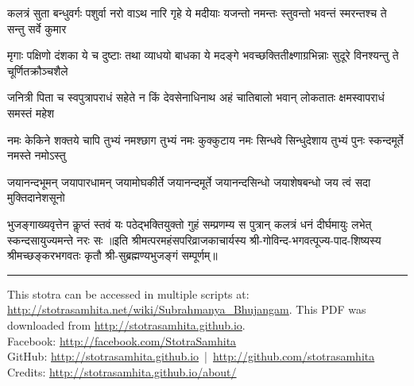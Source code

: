 \documentclass[a5paper,twoside,12pt]{book}
\begin{document}
\begin{center}
\fourlineindentedshloka
{कलत्रं सुता बन्धुवर्गः पशुर्वा}
{नरो वाऽथ नारि गृहे ये मदीयाः}
{यजन्तो नमन्तः स्तुवन्तो भवन्तं}
{स्मरन्तश्च ते सन्तु सर्वे कुमार}

\fourlineindentedshloka
{मृगाः पक्षिणो दंशका ये च दुष्टाः}
{तथा व्याधयो बाधका ये मदङ्गे}
{भवच्छक्तितीक्ष्णाग्रभिन्नाः सुदूरे}
{विनश्यन्तु ते चूर्णितक्रौञ्चशैले}

\fourlineindentedshloka
{जनित्री पिता च स्वपुत्रापराधं}
{सहेते न किं देवसेनाधिनाथ}
{अहं चातिबालो भवान् लोकतातः}
{क्षमस्वापराधं समस्तं महेश}

\fourlineindentedshloka
{नमः केकिने शक्तये चापि तुभ्यं}
{नमश्छाग तुभ्यं नमः कुक्कुटाय}
{नमः सिन्धवे सिन्धुदेशाय तुभ्यं}
{पुनः स्कन्दमूर्ते नमस्ते नमोऽस्तु}

\fourlineindentedshloka
{जयानन्दभूमन् जयापारधामन्}
{जयामोघकीर्ते जयानन्दमूर्ते}
{जयानन्दसिन्धो जयाशेषबन्धो}
{जय त्वं सदा मुक्तिदानेशसूनो}

\fourlineindentedshloka
{भुजङ्गाख्यवृत्तेन कॢप्तं स्तवं यः}
{पठेद्भक्तियुक्तो गुहं सम्प्रणम्य}
{स पुत्रान् कलत्रं धनं दीर्घमायुः}
{लभेत् स्कन्दसायुज्यमन्ते नरः सः}
॥इति  श्रीमत्परमहंसपरिव्राजकाचार्यस्य श्री-गोविन्द-भगवत्पूज्य-पाद-शिष्यस्य
श्रीमच्छङ्करभगवतः कृतौ श्री-सुब्रह्मण्यभुजङ्गं सम्पूर्णम्॥\end{center}
\vfill
\hrule
\footnotesize
{}
\textsf{This stotra can be accessed in multiple scripts at:\\
\url{http://stotrasamhita.net/wiki/Subrahmanya_Bhujangam}. This PDF was downloaded from \url{http://stotrasamhita.github.io}.\\[1ex]
Facebook: \url{http://facebook.com/StotraSamhita}\\[0.7ex]
GitHub: \url{http://stotrasamhita.github.io}~|~\url{http://github.com/stotrasamhita}\\[0.7ex]
Credits: \url{http://stotrasamhita.github.io/about/}}
\end{document}
